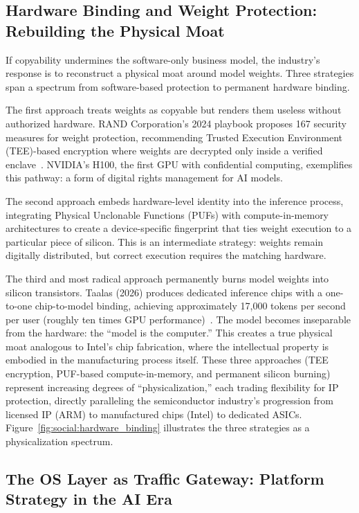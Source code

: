 \subsection{Hardware Binding and Weight Protection: Rebuilding the Physical Moat}
\label{sec:hardware-binding}

If copyability undermines the software-only business model, the industry's response is to reconstruct a physical moat around model weights. Three strategies span a spectrum from software-based protection to permanent hardware binding.

The first approach treats weights as copyable but renders them useless without authorized hardware. RAND Corporation's 2024 playbook proposes 167 security measures for weight protection, recommending Trusted Execution Environment (TEE)-based encryption where weights are decrypted only inside a verified enclave~\cite{rand2024weightplaybook}. NVIDIA's H100, the first GPU with confidential computing, exemplifies this pathway: a form of digital rights management for AI models.

The second approach embeds hardware-level identity into the inference process, integrating Physical Unclonable Functions (PUFs) with compute-in-memory architectures to create a device-specific fingerprint that ties weight execution to a particular piece of silicon. This is an intermediate strategy: weights remain digitally distributed, but correct execution requires the matching hardware.

The third and most radical approach permanently burns model weights into silicon transistors. Taalas (2026) produces dedicated inference chips with a one-to-one chip-to-model binding, achieving approximately 17,000 tokens per second per user (roughly ten times GPU performance)~\cite{taalas_2026_hc1}. The model becomes inseparable from the hardware: the ``model is the computer.'' This creates a true physical moat analogous to Intel's chip fabrication, where the intellectual property is embodied in the manufacturing process itself. These three approaches (TEE encryption, PUF-based compute-in-memory, and permanent silicon burning) represent increasing degrees of ``physicalization,'' each trading flexibility for IP protection, directly paralleling the semiconductor industry's progression from licensed IP (ARM) to manufactured chips (Intel) to dedicated ASICs.
Figure~\ref{fig:social:hardware_binding} illustrates the three strategies as a physicalization spectrum.


\subsection{The OS Layer as Traffic Gateway: Platform Strategy in the AI Era}
\label{sec:os-gateway}

